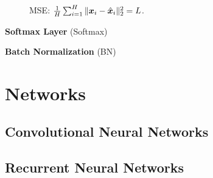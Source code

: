 \documentclass[9pt,twocolumn,times]{article}
\begin{document}
	\begin{figure}[h]
		\centering
		\resizebox{0.618\columnwidth}{!}{%
			
		}
		\caption{MSE: $\frac{1}{H} \sum_{i=1}^H \|{\bm{x}}_i - \hat{{\bm{x}}}_i\|_2^2 = L$.}
	\end{figure}

	\textbf{Softmax Layer} (Softmax)

	\textbf{Batch Normalization} (BN)

\section{Networks}

\subsection{Convolutional Neural Networks}

\subsection{Recurrent Neural Networks}
\end{document}
